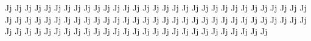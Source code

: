 \documentclass{worksheet}
\begin{document}
\begin{drillsheet}
\calligra
Jj Jj Jj Jj Jj Jj Jj Jj Jj Jj Jj Jj Jj Jj Jj Jj Jj Jj Jj Jj Jj Jj Jj Jj Jj Jj Jj Jj Jj Jj Jj Jj Jj Jj Jj Jj Jj Jj Jj Jj Jj Jj Jj Jj Jj Jj Jj Jj Jj Jj Jj Jj Jj Jj Jj Jj Jj Jj Jj Jj Jj Jj Jj Jj Jj Jj Jj Jj Jj Jj Jj Jj Jj Jj Jj Jj Jj Jj Jj Jj Jj Jj Jj Jj Jj Jj Jj Jj Jj
\end{drillsheet}
\end{document}
